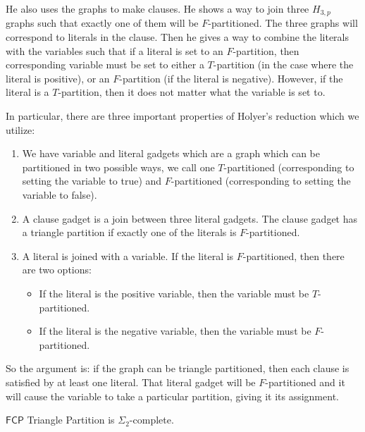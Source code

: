 \documentclass[runningheads,a4paper]{llncs}
\begin{document}
He also uses the graphs to make clauses. He shows a way to join three $H_{3,p}$ graphs such that exactly one of them will be $F$-partitioned. The three graphs will correspond to literals in the clause. Then he gives a way to combine the literals with the variables such that if a literal is set to an $F$-partition, then corresponding variable must be set to either a $T$-partition (in the case where the literal is positive), or an $F$-partition (if the literal is negative). However, if the literal is a $T$-partition, then it does not matter what the variable is set to. 

In particular, there are three important properties of Holyer's reduction which we utilize:
\begin{enumerate}
\item We have variable and literal gadgets which are a graph which can be partitioned in two possible ways, we call one $T$-partitioned (corresponding to setting the variable to true) and $F$-partitioned (corresponding to setting the variable to false).  
\item A clause gadget is a join between three literal gadgets. The clause gadget has a triangle partition if exactly one of the literals is $F$-partitioned.
\item A literal is joined with a variable. If the literal is $F$-partitioned, then there are two options:
\begin{itemize}
\item If the literal is the positive variable, then the variable must be $T$-partitioned.
\item If the literal is the negative variable, then the variable must be $F$-partitioned.
\end{itemize}
\end{enumerate}
So the argument is: if the graph can be triangle partitioned, then each clause is satisfied by at least one literal. That literal gadget will be $F$-partitioned and it will cause the variable to take a particular partition, giving it its assignment. 

\begin{theorem}
$\mathsf{FCP}$ Triangle Partition is $\Sigma_2$-complete.
\end{theorem}
\end{document}

